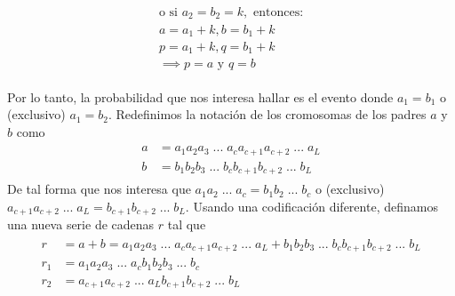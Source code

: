 \documentclass[10pt,letterpaper]{article}
\begin{document}
\begin{enumerate}
            \begin{equation*}\begin{split} \begin{gathered}
                \text{o si } a_2 = b_2 = k, \text{ entonces:} \\
                a = a_1 + k,
                b = b_1 + k\\
                p = a_1 + k,
                q = b_1 + k\\
                \implies p = a \text{ y } q = b
            \end{gathered} \end{split} \end{equation*}

        Por lo tanto, la probabilidad que nos interesa hallar es el evento donde
        $a_1 = b_1$ o (exclusivo) $a_1 = b_2$. Redefinimos la notación de
        los cromosomas de los padres $a$ y $b$ como
            \begin{equation*}\begin{split} \begin{aligned}
                a &= a_1a_2a_3\; ...\; a_ca_{c+1}a_{c+2}\; ...\; a_{L} \\
                b &= b_1b_2b_3\; ...\; b_cb_{c+1}b_{c+2}\; ...\; b_{L}
            \end{aligned} \end{split} \end{equation*}
        De tal forma que nos interesa que $a_1a_2\; ...\; a_c=b_1b_2\; ...\; b_c$ o (exclusivo)
        $a_{c+1}a_{c+2}\; ...\; a_L=b_{c+1}b_{c+2}\; ...\; b_L$.
        Usando una codificación diferente, definamos una nueva serie de cadenas $r$ tal que
            \begin{equation*}\begin{split} \begin{aligned}
                r &= a + b = a_1a_2a_3\; ...\; a_ca_{c+1}a_{c+2}\; ...\; a_{L} + b_1b_2b_3\; ...\; b_cb_{c+1}b_{c+2}\; ...\; b_{L} \\
                r_1 &= a_1a_2a_3\; ...\; a_cb_1b_2b_3\; ...\; b_c \\
                r_2 &= a_{c+1}a_{c+2}\; ...\; a_{L}b_{c+1}b_{c+2}\; ...\; b_{L} \\
            \end{aligned} \end{split} \end{equation*}


\end{enumerate}
\end{document}
